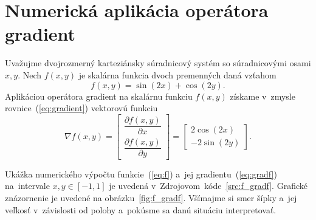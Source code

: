 \documentclass[a4paper, 12pt]{book}
\begin{document}

\appendix
\chapter{Numerická aplikácia operátora gradient}
\label{app:numerical_application_of_gradient}

Uvažujme dvojrozmerný karteziánsky súradnicový systém so súradnicovými osami 
$x, y$.  Nech $f(x, y)$ je skalárna funkcia dvoch premenných daná vzťahom
%
\begin{equation}
\label{eq:f}
f(x, y) = \sin(2x) + \cos(2y){.}
\end{equation}
%
Aplikáciou operátora gradient na skalárnu funkciu $f(x, y)$ získame v~zmysle
rovnice~(\ref{eq:gradient}) vektorovú funkciu
%
\begin{equation}
\label{eq:gradf}
\nabla f(x, y) =
\begin{bmatrix}
\dfrac{\partial f(x, y)}{\partial x} \\[2ex]
\dfrac{\partial f(x, y)}{\partial y}
\end{bmatrix}
=
\begin{bmatrix}
2 \cos(2x) \\[2ex]
-2 \sin(2y)
\end{bmatrix}
{.}
\end{equation}

Ukážka numerického výpočtu funkcie~(\ref{eq:f}) a~jej 
gradientu~(\ref{eq:gradf}) na~intervale $x, y \in [-1, 1]$ je uvedená 
v~Zdrojovom~kóde~\ref{src:f_gradf}.  Grafické znázornenie je uvedené na 
obrázku~\ref{fig:f_gradf}.  Všímajme si smer šípky a~jej veľkosť v~závislosti 
od polohy a~pokúsme sa danú situáciu interpretovať.

\vspace{2ex}


\end{document}
